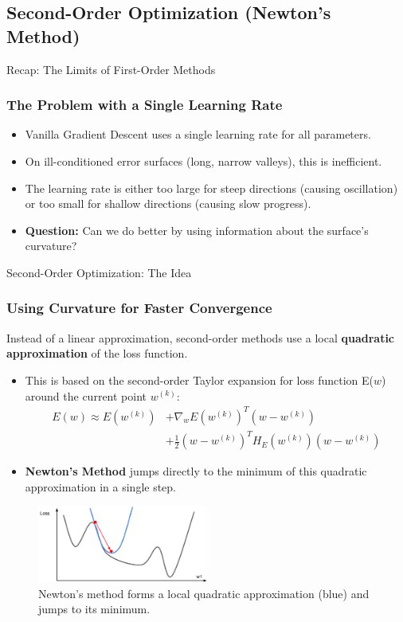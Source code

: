 \subsection{Second-Order Optimization (Newton's Method)}

\begin{frame}{Recap: The Limits of First-Order Methods}
    \frametitle{The Problem with a Single Learning Rate}
    \begin{itemize}
        \item Vanilla Gradient Descent uses a single learning rate for all parameters.
        \item On ill-conditioned error surfaces (long, narrow valleys), this is inefficient.
        \item The learning rate is either too large for steep directions (causing oscillation) or too small for shallow directions (causing slow progress).
        \item \textbf{Question:} Can we do better by using information about the surface's curvature?
    \end{itemize}
\end{frame}

\begin{frame}{Second-Order Optimization: The Idea}
    \frametitle{Using Curvature for Faster Convergence}
    Instead of a linear approximation, second-order methods use a local \textbf{quadratic approximation} of the loss function.
    \begin{itemize}
        \item This is based on the second-order Taylor expansion for loss function E($w$) around the current point $w^{(k)}$:
        \begin{equation*}
        \begin{split}
            E(w) \approx E(w^{(k)}) &+ \nabla_{w}E(w^{(k)})^{T}(w-w^{(k)}) \\
            &+ \frac{1}{2}(w-w^{(k)})^{T}H_{E}(w^{(k)})(w-w^{(k)})
        \end{split}
        \end{equation*}
        \item \textbf{Newton's Method} jumps directly to the minimum of this quadratic approximation in a single step.
    \end{itemize}
    \begin{figure}
        \includegraphics[width=0.5\textwidth]{images/secondmethods.png}
        \caption{Newton's method forms a local quadratic approximation (blue) and jumps to its minimum.}
    \end{figure}
\end{frame}

